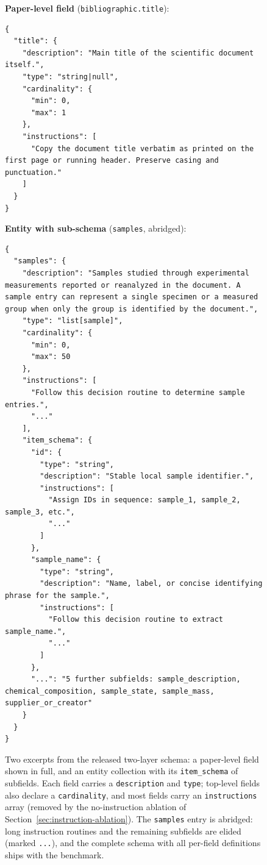 \begin{figure}[t]
\textbf{Paper-level field} (\texttt{bibliographic.title}):
\begin{lstlisting}[style=codeblock]
{
  "title": {
    "description": "Main title of the scientific document itself.",
    "type": "string|null",
    "cardinality": {
      "min": 0,
      "max": 1
    },
    "instructions": [
      "Copy the document title verbatim as printed on the first page or running header. Preserve casing and punctuation."
    ]
  }
}
\end{lstlisting}
\textbf{Entity with sub-schema} (\texttt{samples}, abridged):
\begin{lstlisting}[style=codeblock]
{
  "samples": {
    "description": "Samples studied through experimental measurements reported or reanalyzed in the document. A sample entry can represent a single specimen or a measured group when only the group is identified by the document.",
    "type": "list[sample]",
    "cardinality": {
      "min": 0,
      "max": 50
    },
    "instructions": [
      "Follow this decision routine to determine sample entries.",
      "..."
    ],
    "item_schema": {
      "id": {
        "type": "string",
        "description": "Stable local sample identifier.",
        "instructions": [
          "Assign IDs in sequence: sample_1, sample_2, sample_3, etc.",
          "..."
        ]
      },
      "sample_name": {
        "type": "string",
        "description": "Name, label, or concise identifying phrase for the sample.",
        "instructions": [
          "Follow this decision routine to extract sample_name.",
          "..."
        ]
      },
      "...": "5 further subfields: sample_description, chemical_composition, sample_state, sample_mass, supplier_or_creator"
    }
  }
}
\end{lstlisting}
  \caption{Two excerpts from the released two-layer schema: a paper-level
  field shown in full, and an entity collection with
  its \texttt{item\_schema} of subfields. Each field carries a
  \texttt{description} and \texttt{type}; top-level fields also declare
  a \texttt{cardinality}, and most fields carry an \texttt{instructions}
  array (removed by the no-instruction ablation of
  Section~\ref{sec:instruction-ablation}). The \texttt{samples} entry is
  abridged: long instruction routines and the remaining subfields are
  elided (marked \texttt{...}), and the complete schema with all
  per-field definitions ships with the benchmark.}
  \label{fig:schema-excerpt}
\end{figure}

